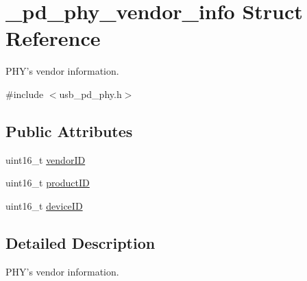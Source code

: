 \hypertarget{struct__pd__phy__vendor__info}{\section{\-\_\-pd\-\_\-phy\-\_\-vendor\-\_\-info Struct Reference}
\label{struct__pd__phy__vendor__info}
}


P\-H\-Y's vendor information.  




{\ttfamily \#include $<$usb\-\_\-pd\-\_\-phy.\-h$>$}

\subsection*{Public Attributes}
\begin{DoxyCompactItemize}
\item 
uint16\-\_\-t \hyperlink{struct__pd__phy__vendor__info_a271bbac00bad57c93a70cfb905bb2d98}{vendor\-I\-D}
\item 
uint16\-\_\-t \hyperlink{struct__pd__phy__vendor__info_a4bd651a05bc50ad4e045b7956ba6f43b}{product\-I\-D}
\item 
uint16\-\_\-t \hyperlink{struct__pd__phy__vendor__info_a356dba0c0968b8a08fee4477f561ea46}{device\-I\-D}
\end{DoxyCompactItemize}


\subsection{Detailed Description}
P\-H\-Y's vendor information. 

